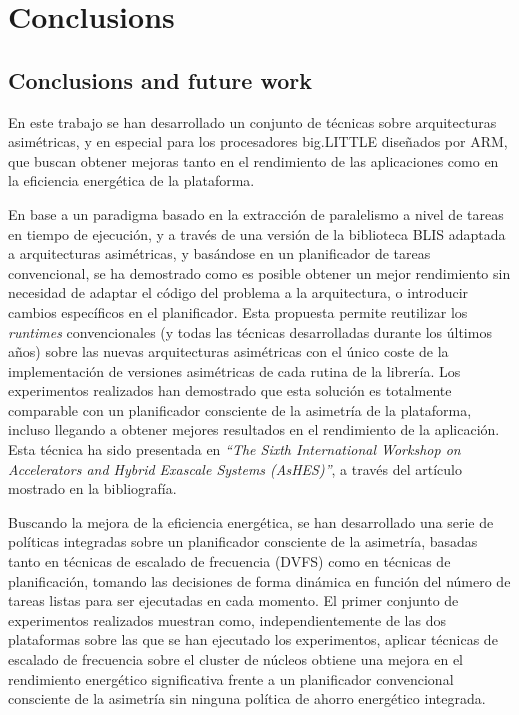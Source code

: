 \cleardoublepage

\chapter{Conclusions}
\label{ch:chapter6}

\section{Conclusions and future work}

En este trabajo se han desarrollado un conjunto de técnicas sobre
arquitecturas asimétricas, y en especial para los procesadores big.LITTLE
diseñados por ARM, que buscan obtener mejoras tanto en el rendimiento de las
aplicaciones como en la eficiencia energética de la plataforma.

En base a un paradigma basado en la extracción de paralelismo a nivel de
tareas en tiempo de ejecución, y a través de una versión de la biblioteca
BLIS adaptada a arquitecturas asimétricas, y basándose en un planificador
de tareas convencional, se ha demostrado como es posible obtener un mejor
rendimiento sin necesidad de adaptar el código del problema a la
arquitectura, o introducir cambios específicos en el planificador. Esta
propuesta permite reutilizar los \emph{runtimes} convencionales (y todas
las técnicas desarrolladas durante los últimos años) sobre las nuevas
arquitecturas asimétricas con el único coste de la implementación de
versiones asimétricas de cada rutina de la librería.  Los experimentos
realizados han demostrado que esta solución es totalmente comparable con un
planificador consciente de la asimetría de la plataforma, incluso llegando
a obtener mejores resultados en el rendimiento de la aplicación. Esta
técnica ha sido presentada en \emph{``The Sixth International Workshop on
  Accelerators and Hybrid Exascale Systems (AsHES)''}, a través del
artículo~\cite{ashes} mostrado en la bibliografía.

Buscando la mejora de la eficiencia energética, se han desarrollado una
serie de políticas integradas sobre un planificador consciente de la
asimetría, basadas tanto en técnicas de escalado de frecuencia (DVFS) como
en técnicas de planificación, tomando las decisiones de forma dinámica en
función del número de tareas listas para ser ejecutadas en cada momento. El
primer conjunto de experimentos realizados muestran como,
independientemente de las dos plataformas sobre las que se han ejecutado
los experimentos, aplicar técnicas de escalado de frecuencia sobre el
cluster de núcleos \BIG obtiene una mejora en el rendimiento energético
significativa frente a un planificador convencional consciente de la
asimetría sin ninguna política de ahorro energético integrada.


